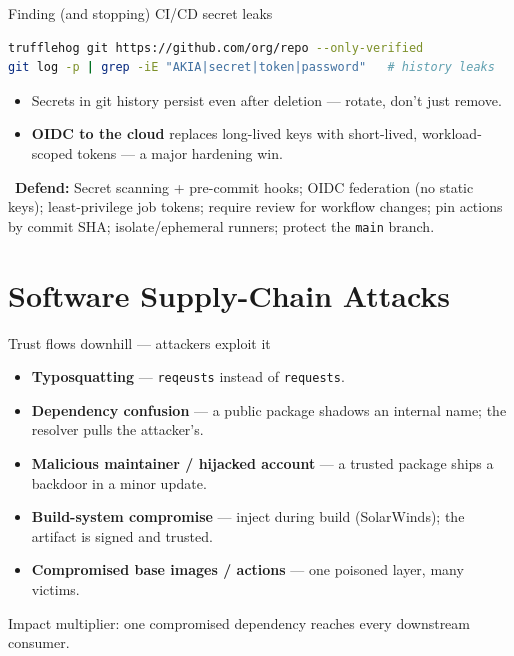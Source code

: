 \documentclass[aspectratio=169,11pt]{beamer}
\newcommand{\defend}[1]{\textcolor{okGreen}{\faLock\ \textbf{Defend:} #1}}
\begin{document}
\begin{frame}[fragile]{Finding (and stopping) CI/CD secret leaks}
  \begin{lstlisting}[language=bash]
trufflehog git https://github.com/org/repo --only-verified
git log -p | grep -iE "AKIA|secret|token|password"   # history leaks
  \end{lstlisting}
  \begin{itemize}\footnotesize
    \item Secrets in git history persist even after deletion --- rotate, don't
          just remove.
    \item \textbf{OIDC to the cloud} replaces long-lived keys with short-lived,
          workload-scoped tokens --- a major hardening win.
  \end{itemize}
  \defend{Secret scanning + pre-commit hooks; OIDC federation (no static keys);
  least-privilege job tokens; require review for workflow changes; pin actions
  by commit SHA; isolate/ephemeral runners; protect the \texttt{main} branch.}
\end{frame}

\section{Software Supply-Chain Attacks}
\begin{frame}{Trust flows downhill --- attackers exploit it}
  \begin{itemize}
    \item \textbf{Typosquatting} --- \texttt{reqeusts} instead of
          \texttt{requests}.
    \item \textbf{Dependency confusion} --- a public package shadows an internal
          name; the resolver pulls the attacker's.
    \item \textbf{Malicious maintainer / hijacked account} --- a trusted package
          ships a backdoor in a minor update.
    \item \textbf{Build-system compromise} --- inject during build (SolarWinds);
          the artifact is signed and trusted.
    \item \textbf{Compromised base images / actions} --- one poisoned layer,
          many victims.
  \end{itemize}
  \footnotesize Impact multiplier: one compromised dependency reaches every
  downstream consumer.
\end{frame}
\end{document}
